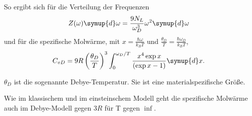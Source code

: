 So ergibt sich für die Verteilung der Frequenzen
\begin{equation}
  Z(\omega)\symup{d}\omega = \frac{9N_L}{\omega_D^3}\omega^2 \symup{d}\omega
\end{equation}
und für die spezifische Molwärme, mit $x = \frac{\hbar\omega}{k_BT}$ und $\frac{\theta_D}{T} = \frac{\hbar\omega_D}{k_BT}$,
\begin{equation}
  C_{vD} = 9R \left( \frac{\theta_D}{T}\right)^3 \int_0^{\omega_D/T} \frac{x^4 \exp{x}}{\left(\exp{x}-1\right)} \symup{d}x.
\end{equation}

$\theta_D$ ist die sogenannte Debye-Temperatur. Sie ist eine materialspezifische Größe.

\bigskip
Wie im klassischem und im einsteinschem Modell geht die spezifische Molwärme auch im
Debye-Modell gegen $3R$ für T gegen $\inf$.
